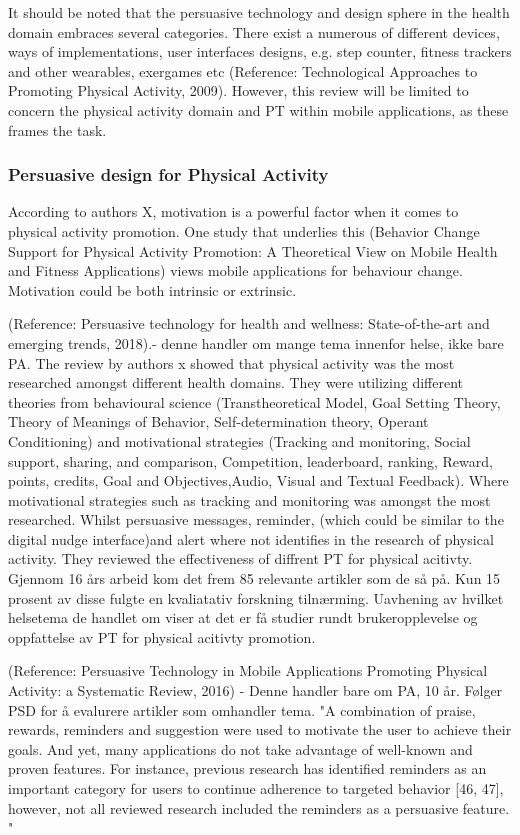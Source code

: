 It should be noted that the persuasive technology and design sphere in the health domain embraces several categories. There exist a numerous of different devices, ways of implementations, user interfaces designs, e.g. step counter, fitness trackers and other wearables, exergames etc (Reference: Technological Approaches to Promoting Physical Activity, 2009). However, this review will be limited to concern the physical activity domain and PT within mobile applications, as these frames the task. 

\subsubsection{Persuasive design for Physical Activity}
According to authors X, motivation is a powerful factor when it comes to physical activity promotion. One study that underlies this (Behavior Change Support for Physical Activity Promotion: A Theoretical View on Mobile Health and Fitness Applications) views mobile applications for behaviour change. Motivation could be both intrinsic or extrinsic.  

(Reference: Persuasive technology for health and wellness: State-of-the-art and emerging trends, 2018).- denne handler om mange tema innenfor helse, ikke bare PA. 
The review by authors x showed that physical activity was the most researched amongst different health domains. They were utilizing different theories from behavioural science (Transtheoretical Model, Goal Setting Theory, Theory of Meanings of Behavior, Self-determination theory, Operant Conditioning) and motivational strategies (Tracking and monitoring, Social support, sharing, and comparison,  Competition, leaderboard, ranking, Reward, points, credits,  Goal and Objectives,Audio, Visual and Textual Feedback).  
Where motivational strategies such as tracking and monitoring was amongst the most researched. Whilst persuasive messages, reminder, (which could be similar to the digital nudge interface)and alert where not identifies in the research of physical activity.
They reviewed the effectiveness of diffrent PT for physical acitivty. 
Gjennom 16 års arbeid kom det frem 85 relevante artikler som de så på. Kun 15 prosent av disse fulgte en kvaliatativ forskning tilnærming. Uavhening av hvilket helsetema de handlet om viser at det er få studier rundt brukeropplevelse og oppfattelse av PT for physical acitivty promotion. 

(Reference: Persuasive Technology in Mobile Applications Promoting Physical Activity: a Systematic Review, 2016) - Denne handler bare om PA, 10 år. Følger PSD for å evalurere artikler som omhandler tema. 
"A combination of praise, rewards, reminders and suggestion were used to motivate the user to achieve their goals. And yet, many applications do not take advantage of well-known and proven features. For instance, previous research has identified reminders as an important category for users to continue adherence to targeted behavior [46, 47], however, not all reviewed research included the reminders as a persuasive feature. "

